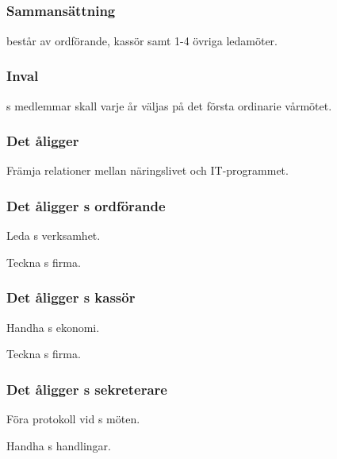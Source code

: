 \subsection{\ARMITFULL}
\subsubsection{Sammansättning}
\ARMIT{} består av ordförande, kassör samt 1-4 övriga ledamöter.

\subsubsection{Inval}
\ARMIT{}s medlemmar skall varje år väljas på det första ordinarie vårmötet.

\subsubsection{Det åligger \ARMIT}
\begin{att}
	\item Främja relationer mellan näringslivet och IT-programmet.
\end{att}

\subsubsection{Det åligger \ARMIT{}s ordförande}
\begin{att}
	\item Leda \ARMIT{}s verksamhet.
	\item Teckna \ARMIT{}s firma.
\end{att}

\subsubsection{Det åligger \ARMIT{}s kassör}
\begin{att}
	\item Handha \ARMIT{}s ekonomi.
	\item Teckna \ARMIT{}s firma.
\end{att}

\subsubsection{Det åligger \ARMIT{}s sekreterare}
\begin{att}
	\item Föra protokoll vid \ARMIT{}s möten.
	\item Handha \ARMIT{}s handlingar.
\end{att}